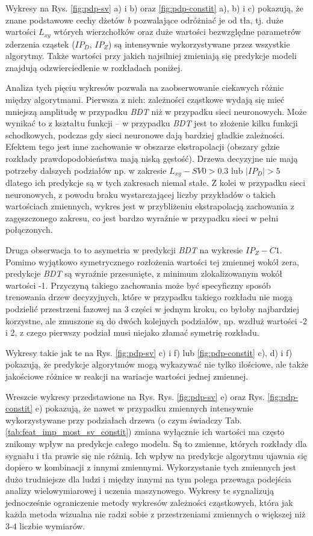 \vspace{1em}
Wykresy na Rys. \ref{fig:pdp-sv} a) i b) oraz \ref{fig:pdp-constit} a), b) i c) pokazują, że znane podstawowe cechy dżetów \textit{b} pozwalające odróżniać je od tła, tj. duże wartości $L_{xy}$ wtórych wierzchołków oraz duże wartości bezwzględne parametrów zderzenia cząstek ($IP_D$, $IP_Z$) są intensywnie wykorzystywane przez wszystkie algorytmy. Także wartości przy jakich najsilniej zmieniają się predykcje modeli znajdują odzwierciedlenie w rozkładach poniżej.

Analiza tych pięciu wykresów pozwala na zaobserwowanie ciekawych różnic między algorytmami.
Pierwsza z nich: zależności cząstkowe wydają się mieć mniejszą amplitudę w przypadku \textit{BDT} niż w przypadku sieci neuronowych. Może wynikać to z kształtu funkcji -- w przypadku \textit{BDT} jest to złożenie kilku funkcji schodkowych, podczas gdy sieci neuronowe dają bardziej gładkie zależności. Efektem tego jest inne zachowanie w obszarze ekstrapolacji (obszary gdzie rozkłady prawdopodobieństwa mają niską gęstość). Drzewa decyzyjne nie mają potrzeby dalszych podziałów np. w zakresie $L_{xy} - SV0 > 0.3$ lub $|IP_D| > 5$ dlatego ich predykcje są w tych zakresach niemal stałe. Z kolei w przypadku sieci neuronowych, z powodu braku wystarczającej liczby przykładów o takich wartościach zmiennych, wykres jest w przybliżeniu ekstrapolacją zachowania z zagęszczonego zakresu, co jest bardzo wyraźnie w przypadku sieci w pełni połączonych. 

Druga obserwacja to to asymetria w predykcji \textit{BDT} na wykresie $IP_Z - C1$. Pomimo wyjątkowo symetrycznego rozłożenia wartości tej zmiennej wokół zera, predykcje \textit{BDT} są wyraźnie przesunięte, z minimum zlokalizowanym wokół wartości -1.
Przyczyną takiego zachowania może być specyficzny sposób trenowania drzew decyzyjnych, które w przypadku takiego rozkładu nie mogą podzielić przestrzeni fazowej na 3 części w jednym kroku, co byłoby najbardziej korzystne, ale zmuszone są do dwóch kolejnych podziałów, np. wzdłuż wartości -2 i 2, z czego pierwszy podział musi niejako złamać symetrię rozkładu.

Wykresy takie jak te na Rys. \ref{fig:pdp-sv} c) i f) lub \ref{fig:pdp-constit} c), d) i f) pokazują, że predykcje algorytmów mogą wykazywać nie tylko ilościowe, ale także jakościowe różnice w reakcji na wariacje wartości jednej zmiennej.

Wreszcie wykresy przedstawione na Rys. Rys. \ref{fig:pdp-sv} e) oraz Rys. \ref{fig:pdp-constit} e) pokazują, że nawet w przypadku zmiennych intensywnie wykorzystywane przy podziałach drzewa (o czym świadczy Tab. \ref{tab:feat_imp_most_sv_constit}) zmiana wyłącznie ich wartości ma często znikomy wpływ na predykcje całego modelu. Są to zmienne, których rozkłady dla sygnału i tła prawie się nie różnią. Ich wpływ na predykcje algorytmu ujawnia się dopiero w kombinacji z innymi zmiennymi.
Wykorzystanie tych zmiennych jest dużo trudniejsze dla ludzi i między innymi na tym polega przewaga podejścia analizy wielowymiarowej i uczenia maszynowego.
Wykresy te sygnalizują jednocześnie ograniczenie metody wykresów zależności cząstkowych, która jak każda metoda wizualna nie radzi sobie z przestrzeniami zmiennych o większej niż 3-4 liczbie wymiarów.

